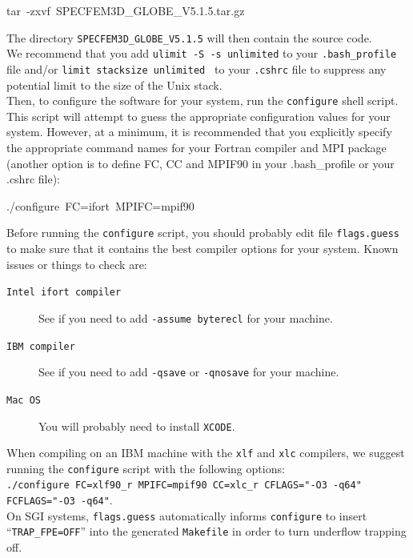 \documentclass[oneside,english]{book}
\newenvironment{lyxcode}
{\begin{list}{}{
\setlength{\rightmargin}{\leftmargin}
\setlength{\listparindent}{0pt}%
\raggedright
\setlength{\itemsep}{0pt}
\setlength{\parsep}{0pt}
\normalfont\ttfamily}%
 \item[]}
{\end{list}}
\begin{document}
\begin{lyxcode}
tar~-zxvf~SPECFEM3D\_GLOBE\_V5.1.5.tar.gz
\end{lyxcode}
The directory \texttt{SPECFEM3D\_GLOBE\_V5.1.5} will then contain
the source code.\\

We recommend that you add {\texttt{ulimit -S -s unlimited}} to your {\texttt{.bash\_profile}} file and/or {\texttt{limit stacksize unlimited }} to your {\texttt{.cshrc}} file to suppress any potential limit to the size of the Unix stack.\\

Then, to configure the software for your system, run the \texttt{configure}
shell script. This script will attempt to guess the appropriate configuration
values for your system. However, at a minimum, it is recommended that
you explicitly specify the appropriate command names for your Fortran
compiler and MPI package (another option is to define FC, CC and MPIF90 in your .bash\_profile
or your .cshrc file):

\begin{lyxcode}
./configure~FC=ifort~MPIFC=mpif90
\end{lyxcode}

Before running the \texttt{configure} script, you should probably edit file \texttt{flags.guess} to make sure that it contains the best compiler options for your system. Known issues or things to check are:

\begin{description}
\item [{\texttt{Intel ifort compiler}}] See if you need to add \texttt{-assume byterecl} for your machine.
\item [{\texttt{IBM compiler}}] See if you need to add \texttt{-qsave} or \texttt{-qnosave} for your machine.
\item [{\texttt{Mac OS}}] You will probably need to install \texttt{XCODE}.
\end{description}

When compiling on an IBM machine with the \texttt{xlf} and \texttt{xlc} compilers, we suggest running the \texttt{configure} script
with the following options:\\

\noindent\texttt{./configure FC=xlf90\_r MPIFC=mpif90 CC=xlc\_r CFLAGS="-O3 -q64" FCFLAGS="-O3 -q64"}.\\

On SGI systems, \texttt{flags.guess} automatically informs \texttt{configure}
to insert ``\texttt{TRAP\_FPE=OFF}'' into the generated \texttt{Makefile}
in order to turn underflow trapping off.\\
\end{document}
